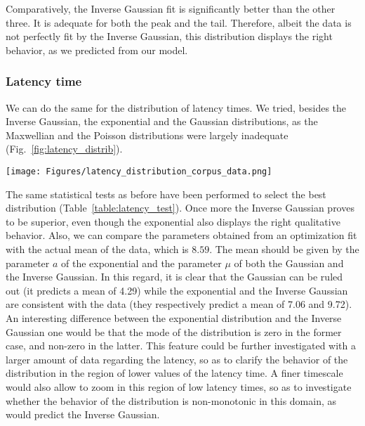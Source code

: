 \documentclass[12pt,twocolumn,amsmath,amssymb,aps,longbibliography]{revtex4-1}  %
\begin{document}
Comparatively, the Inverse Gaussian fit is significantly better than the other three. It is adequate for both the peak and the tail. Therefore, albeit the data is not perfectly fit by the Inverse Gaussian, this distribution displays the right behavior, as we predicted from our model.

\subsubsection{Latency time}

We can do the same for the distribution of latency times. We tried, besides the Inverse Gaussian, the exponential and the Gaussian distributions, as the Maxwellian and the Poisson distributions were largely inadequate (Fig.~\ref{fig:latency_distrib}).

\begin{figure*}[!tp]
  \centering
  \texttt{[image: Figures/latency\_distribution\_corpus\_data.png]}
  \caption{Several fits of the distribution of latency times as extracted from corpus data.}
  \label{fig:latency_distrib}
\end{figure*}

The same statistical tests as before have been performed to select the best distribution (Table~\ref{table:latency_test}). Once more the Inverse Gaussian proves to be superior, even though the exponential also displays the right qualitative behavior.  Also, we can compare the parameters obtained from an optimization fit with the actual mean of the data, which is $8.59$. The mean should be given by the parameter $a$ of the exponential and the parameter $\mu$ of both the Gaussian and the Inverse Gaussian. In this regard, it is clear that the Gaussian can be ruled out (it predicts a mean of 4.29) while the exponential and the Inverse Gaussian are consistent with the data (they respectively predict a mean of 7.06 and 9.72). An interesting difference between the exponential distribution and the Inverse Gaussian one would be that the mode of the distribution is zero in the former case, and non-zero in the latter. This feature could be further investigated with a larger amount of data regarding the latency, so as to clarify the behavior of the distribution in the region of lower values of the latency time. A finer timescale would also allow to zoom in this region of low latency times, so as to investigate whether the behavior of the distribution is non-monotonic in this domain, as would predict the Inverse Gaussian.
\end{document}
